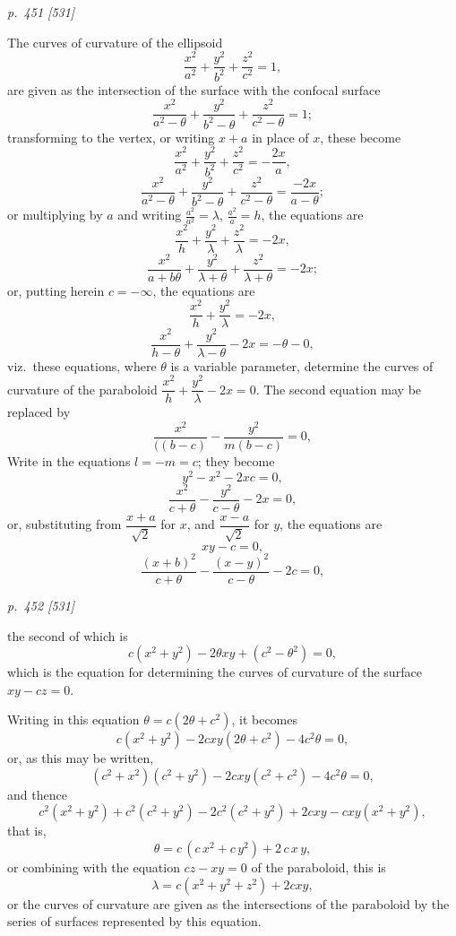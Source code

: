 \documentclass[11pt,a4paper]{book}
\begin{document}
\medskip

\clearpage

\bigskip
\textit{p.~451 [531]}
\smallskip

The curves of curvature of the ellipsoid
\[
\frac{x^2}{a^2} + \frac{y^2}{b^2} + \frac{z^2}{c^2} = 1,
\]
are given as the intersection of the surface with the confocal surface
\[
\frac{x^2}{a^2 - \theta} + \frac{y^2}{b^2 - \theta} + \frac{z^2}{c^2 - \theta} = 1;
\]
transforming to the vertex, or writing $x + a$ in place of $x$, these become
\[
\frac{x^2}{a^2} + \frac{y^2}{b^2} + \frac{z^2}{c^2} = -\frac{2 x}{a},
\]
\[
\frac{x^2}{a^2 - \theta} + \frac{y^2}{b^2 - \theta} + \frac{z^2}{c^2 - \theta} = \frac{-2 x}{a - \theta};
\]
or multiplying by $a$ and writing $\frac{a^2}{a^2} = \lambda$, $\frac{a^2}{a} = h$, the equations are
\[
\frac{x^2}{h} + \frac{y^2}{\lambda} + \frac{z^2}{\lambda} = -2x,
\]
\[
\frac{x^2}{a + b\theta} + \frac{y^2}{\lambda + \theta} + \frac{z^2}{\lambda + \theta} = -2x;
\]
or, putting herein $c = -\infty$, the equations are
\[
\frac{x^2}{h} + \frac{y^2}{\lambda} = -2x,
\]
\[
\frac{x^2}{h - \theta} + \frac{y^2}{\lambda - \theta} - 2x = -\theta - 0,
\]
viz.\ these equations, where $\theta$ is a variable parameter, determine the curves of curvature
of the paraboloid $\dfrac{x^2}{h} + \dfrac{y^2}{\lambda} - 2x = 0$. The second equation may be replaced by
\[
\frac{x^2}{((b - c)} - \frac{y^2}{m(b - c)} = 0,
\]
Write in the equations $l = -m = c$; they become
\[
y^2 - x^2 - 2xc = 0,
\]
\[
\frac{x^2}{c + \theta} - \frac{y^2}{c - \theta} - 2x = 0,
\]
or, substituting from $\dfrac{x + a}{\sqrt{2}}$ for $x$, and $\dfrac{x - a}{\sqrt{2}}$ for $y$, the equations are
\[
xy - c = 0,
\]
\[
\frac{(x + b)^2}{c + \theta} - \frac{(x - y)^2}{c - \theta} - 2c = 0,
\]

\clearpage

\bigskip
\textit{p.~452 [531]}
\smallskip

the second of which is
\[
c(x^2 + y^2) - 2\theta xy + (c^2 - \theta^2) = 0,
\]
which is the equation for determining the curves of curvature of the surface $xy - cz = 0$.

Writing in this equation $\theta = c(2\theta + c^2)$, it becomes
\[
c(x^2 + y^2) - 2cxy(2\theta + c^2) - 4c^2\theta = 0,
\]
or, as this may be written,
\[
(c^2 + x^2)(c^2 + y^2) - 2cxy(c^2 + c^2) - 4c^2\theta = 0,
\]
and thence
\[
c^2(x^2 + y^2) + c^2(c^2 + y^2) - 2c^2(c^2 + y^2) + 2cxy - cxy(x^2 + y^2),
\]
that is,
\[
\theta = c\,(c\,x^2 + c\,y^2) + 2\,c\,x\,y,
\]
or combining with the equation $cz - xy = 0$ of the paraboloid, this is
\[
\lambda = c(x^2 + y^2 + z^2) + 2cxy,
\]
or the curves of curvature are given as the intersections of the paraboloid by the
series of surfaces represented by this equation.
\end{document}
